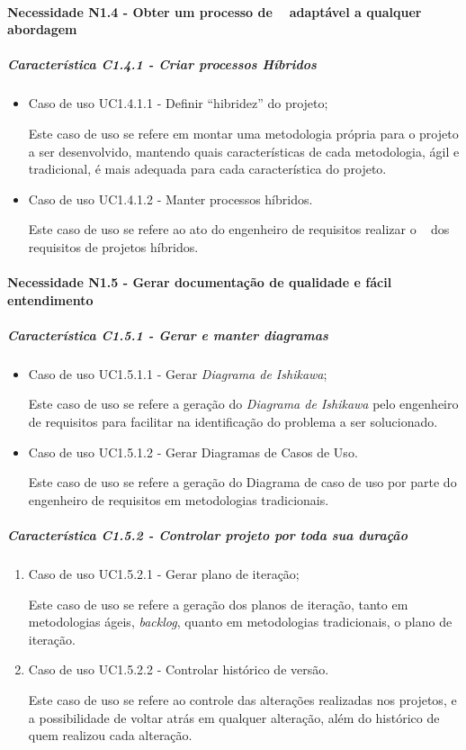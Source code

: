 \paragraph{Necessidade N1.4 - Obter um processo de \er~ adaptável a qualquer abordagem}
	\subparagraph{Característica C1.4.1 - Criar processos Híbridos}
		\begin{itemize}
			
			\item Caso de uso UC1.4.1.1 - Definir ``hibridez'' do projeto;

				Este caso de uso se refere em montar uma metodologia própria para o projeto a ser desenvolvido, mantendo quais características de cada metodologia, ágil e tradicional, é mais adequada para cada característica do projeto.
			
			\item Caso de uso UC1.4.1.2 - Manter processos híbridos.

				Este caso de uso se refere ao ato do engenheiro de requisitos realizar o \CRUD~ dos requisitos de projetos híbridos.
		\end{itemize}

\paragraph{Necessidade N1.5 - Gerar documentação de qualidade e fácil entendimento}
	\subparagraph{Característica C1.5.1 - Gerar e manter diagramas}
		\begin{itemize}
			
			\item Caso de uso UC1.5.1.1 - Gerar \textit{Diagrama de Ishikawa};

				Este caso de uso se refere a geração do \textit{Diagrama de Ishikawa} pelo engenheiro de requisitos para facilitar na identificação do problema a ser solucionado. 
			
			\item Caso de uso UC1.5.1.2 - Gerar Diagramas de Casos de Uso.

				Este caso de uso se refere a geração do Diagrama de caso de uso por parte do engenheiro de requisitos em metodologias tradicionais.
		\end{itemize}

	\subparagraph{Característica C1.5.2 - Controlar projeto por toda sua duração}
		\begin{enumerate}
			
			\item Caso de uso UC1.5.2.1 - Gerar plano de iteração;

				Este caso de uso se refere a geração dos planos de iteração, tanto em metodologias ágeis, \textit{backlog}, quanto em metodologias tradicionais, o plano de iteração.
			
			\item Caso de uso UC1.5.2.2 - Controlar histórico de versão.

				Este caso de uso se refere ao controle das alterações realizadas nos projetos, e a possibilidade de voltar atrás em qualquer alteração, além do histórico de quem realizou cada alteração.
		\end{enumerate}

